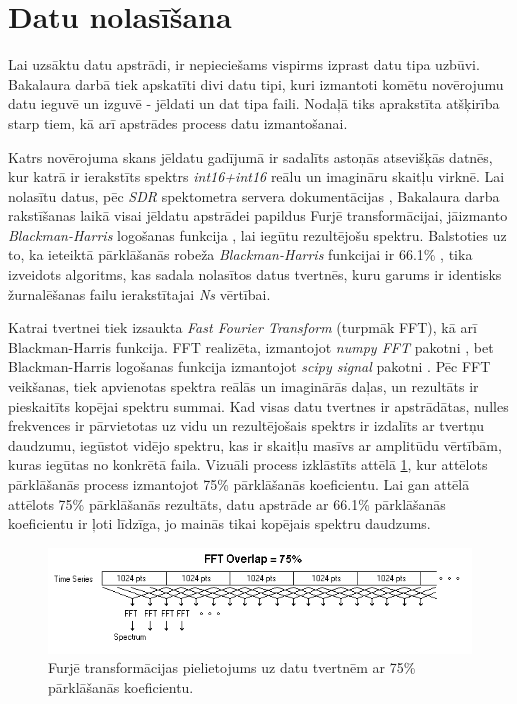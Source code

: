 \section{Datu nolasīšana} \label{read-data}
Lai uzsāktu datu apstrādi, ir nepieciešams vispirms izprast datu tipa uzbūvi. Bakalaura darbā tiek apskatīti divi datu tipi, kuri izmantoti komētu novērojumu datu ieguvē un izguvē - jēldati un dat tipa faili. Nodaļā tiks aprakstīta atšķirība starp tiem, kā arī apstrādes process datu izmantošanai.




Katrs novērojuma skans jēldatu gadījumā ir sadalīts astoņās atsevišķās datnēs, kur katrā ir ierakstīts spektrs \textit{int16+int16} reālu un imagināru skaitļu virknē. Lai nolasītu datus, pēc \textit{SDR} spektometra servera dokumentācijas \cite{sdrspec}, Bakalaura darba rakstīšanas laikā visai jēldatu apstrādei papildus Furjē transformācijai, jāizmanto \textit{Blackman-Harris} logošanas funkcija \cite{blackman-harris}, lai iegūtu rezultējošu spektru. Balstoties uz to, ka ieteiktā pārklāšanās robeža \textit{Blackman-Harris} funkcijai ir 66.1\% \cite{overlapping}, tika izveidots algoritms, kas sadala nolasītos datus tvertnēs, kuru garums ir identisks žurnalēšanas failu ierakstītajai \textit{Ns} vērtībai.

Katrai tvertnei tiek izsaukta \textit{Fast Fourier Transform} (turpmāk FFT), kā arī Blackman-Harris funkcija. FFT realizēta, izmantojot \textit{numpy FFT} pakotni \cite{numpy-fft}, bet Blackman-Harris logošanas funkcija izmantojot \textit{scipy signal} pakotni \cite{scipy-blackman}. Pēc FFT veikšanas, tiek apvienotas spektra reālās un imaginārās daļas, un rezultāts ir pieskaitīts kopējai spektru summai. Kad visas datu tvertnes ir apstrādātas, nulles frekvences ir pārvietotas uz vidu un rezultējošais spektrs ir izdalīts ar tvertņu daudzumu, iegūstot vidējo spektru, kas ir skaitļu masīvs ar amplitūdu vērtībām, kuras iegūtas no konkrētā faila. Vizuāli process izklāstīts attēlā \ref{fig:overlapping}, kur attēlots pārklāšanās process izmantojot 75\% pārklāšanās koeficientu. Lai gan attēlā attēlots 75\% pārklāšanās rezultāts, datu apstrāde ar 66.1\% pārklāšanās koeficientu ir ļoti līdzīga, jo mainās tikai kopējais spektru daudzums.

\begin{figure}[H]
\centering
\includegraphics[width=\textwidth]{images/internet/OVERLAP2.png}
\caption{Furjē transformācijas pielietojums uz datu tvertnēm ar 75\% pārklāšanās koeficientu. \cite{overlapping-img}}
\label{fig:overlapping}
\end{figure}

